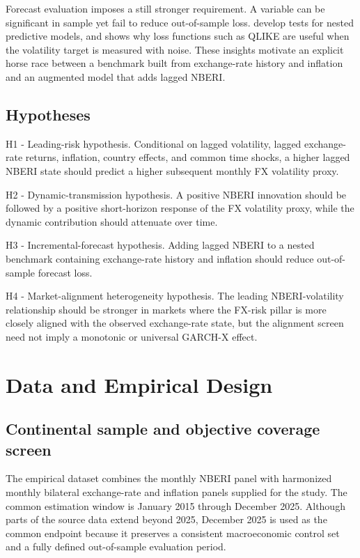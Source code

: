 \documentclass[11pt]{article}
\begin{document}
Forecast evaluation imposes a still stronger requirement. A variable can
be significant in sample yet fail to reduce out-of-sample loss. \citet{clark2007} develop tests for nested predictive models, and \citet{patton2011} shows why loss functions such as QLIKE are useful when the
volatility target is measured with noise. These insights motivate an
explicit horse race between a benchmark built from exchange-rate history
and inflation and an augmented model that adds lagged NBERI.

\subsection{Hypotheses}\label{hypotheses}

H1 - Leading-risk hypothesis. Conditional on lagged volatility, lagged
exchange-rate returns, inflation, country effects, and common time
shocks, a higher lagged NBERI state should predict a higher subsequent
monthly FX volatility proxy.

H2 - Dynamic-transmission hypothesis. A positive NBERI innovation should
be followed by a positive short-horizon response of the FX volatility
proxy, while the dynamic contribution should attenuate over time.

H3 - Incremental-forecast hypothesis. Adding lagged NBERI to a nested
benchmark containing exchange-rate history and inflation should reduce
out-of-sample forecast loss.

H4 - Market-alignment heterogeneity hypothesis. The leading
NBERI-volatility relationship should be stronger in markets where the
FX-risk pillar is more closely aligned with the observed exchange-rate
state, but the alignment screen need not imply a monotonic or universal
GARCH-X effect.

\section{Data and Empirical Design}\label{data-and-empirical-design}

\subsection{Continental sample and objective coverage
screen}\label{continental-sample-and-objective-coverage-screen}

The empirical dataset combines the monthly NBERI panel with harmonized
monthly bilateral exchange-rate and inflation panels supplied for the
study. The common estimation window is January 2015 through December
2025. Although parts of the source data extend beyond 2025, December
2025 is used as the common endpoint because it preserves a consistent
macroeconomic control set and a fully defined out-of-sample evaluation
period.
\end{document}
